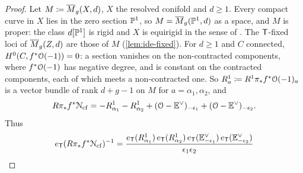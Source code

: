 \begin{proof}
Let $M\coloneqq\overline{M}_g(X,d)$, $X$ the resolved conifold and $d\geq 1$. Every compact curve in $X$ lies in the zero section $\mathbb{P}^1$, so $M=\overline{M}_g(\mathbb{P}^1,d)$ as a space, and $M$ is proper: the class $d[\mathbb{P}^1]$ is rigid and $X$ is equirigid in the sense of \cite{BS}.  The $\mathsf{T}$-fixed loci of $\overline{M}_g(Z,d)$ are those of $M$ (\cref{lem:ide-fixed}). For $d\geq 1$ and $C$ connected, $H^0(C,f^*\mathcal{O}(-1))=0$: a section vanishes on the non-contracted components, where $f^*\mathcal{O}(-1)$ has negative degree, and is constant on the contracted components, each of which meets a non-contracted one. So $R^1_{a}\coloneqq R^1\pi_*f^*\mathcal{O}(-1)_{a}$ is a vector bundle of rank $d+g-1$ on $M$ for $a=\alpha_1,\alpha_2$, and
\[
R\pi_*f^*\mathcal{N}_{\mathrm{cf}}=-R^1_{\alpha_1}-R^1_{\alpha_2}+(\mathcal{O}-\mathbb{E}^\vee)_{-\epsilon_1}+(\mathcal{O}-\mathbb{E}^\vee)_{-\epsilon_2}.
\]
Thus
\[
e_{\mathsf{T}}(R\pi_*f^*\mathcal{N}_{\mathrm{cf}})^{-1}=\frac{e_{\mathsf{T}}(R^1_{\alpha_1})\,e_{\mathsf{T}}(R^1_{\alpha_2})\,e_{\mathsf{T}}(\mathbb{E}^\vee_{-\epsilon_1})\,e_{\mathsf{T}}(\mathbb{E}^\vee_{-\epsilon_2})}{\epsilon_1\epsilon_2}
\]

\end{proof}
